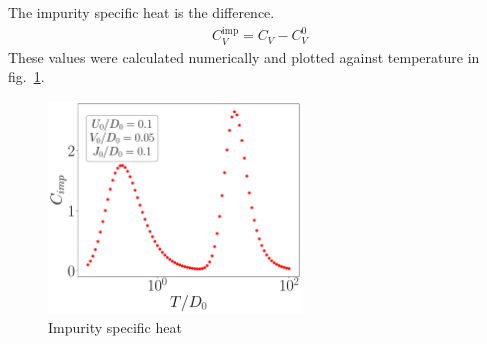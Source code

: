 \documentclass{report}
\numberwithin{equation}{section}
\begin{document}
The impurity specific heat is the difference.
\begin{equation}\begin{aligned}
	C_V^\text{imp} = C_V - C_V^0
\end{aligned}\end{equation}
These values were calculated numerically and plotted against temperature in fig.~\ref{cv}.
\begin{figure}[htpb]
	\centering
	\includegraphics[width=0.6\textwidth]{../figures/Cv.pdf}
	\caption{Impurity specific heat}
	\label{cv}
\end{figure}
\end{document}
